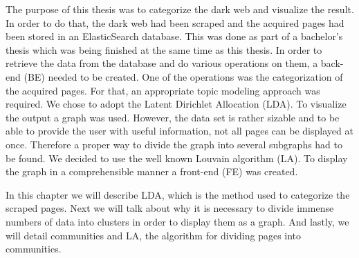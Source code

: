 The purpose of this thesis was to categorize the dark web and visualize the result. In order to do that, the dark web had been scraped and the acquired pages had been stored in an ElasticSearch database. This was done as part of a bachelor's thesis which was being finished at the same time as this thesis. In order to retrieve the data from the database and do various operations on them, a back-end (BE) needed to be created. One of the operations was the categorization of the acquired pages. For that, an appropriate topic modeling approach was required. We chose to adopt the Latent Dirichlet Allocation (LDA). To visualize the output a graph was used. However, the data set is rather sizable and to be able to provide the user with useful information, not all pages can be displayed at once. Therefore a proper way to divide the graph into several subgraphs had to be found. We decided to use the well known Louvain algorithm (LA). To display the graph in a comprehensible manner a front-end (FE) was created.

In this chapter we will describe LDA,  which is the method used to categorize the scraped pages. Next we will talk about why it is necessary to divide immense numbers of data into clusters in order to display them as a graph. And lastly, we will detail communities and LA, the algorithm for dividing pages into communities. 

